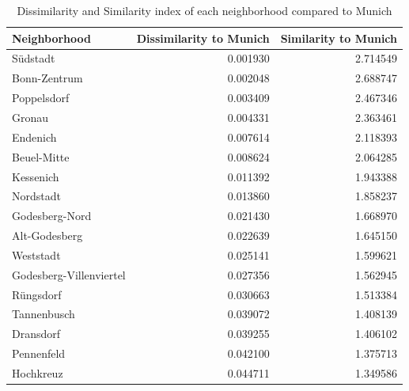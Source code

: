 \documentclass[UKenglish]{scrreprt}
\begin{document}
\begin{table}
	\small
	\caption{Dissimilarity and Similarity index of each neighborhood compared to Munich}
	\label{tab:similiarity_neighborhoods}
	\centering
	\begin{tabular}{lrr}
		\toprule
		Neighborhood &  Dissimilarity to Munich &  Similarity to Munich \\
		\midrule
		Südstadt                            &                 0.001930 &              2.714549 \\
		Bonn-Zentrum                        &                 0.002048 &              2.688747 \\
		Poppelsdorf                         &                 0.003409 &              2.467346 \\
		Gronau                              &                 0.004331 &              2.363461 \\
		Endenich                            &                 0.007614 &              2.118393 \\
		Beuel-Mitte                         &                 0.008624 &              2.064285 \\
		Kessenich                           &                 0.011392 &              1.943388 \\
		Nordstadt                           &                 0.013860 &              1.858237 \\
		Godesberg-Nord                      &                 0.021430 &              1.668970 \\
		Alt-Godesberg                       &                 0.022639 &              1.645150 \\
		Weststadt                           &                 0.025141 &              1.599621 \\
		Godesberg-Villenviertel             &                 0.027356 &              1.562945 \\
		Rüngsdorf                           &                 0.030663 &              1.513384 \\
		Tannenbusch                         &                 0.039072 &              1.408139 \\
		Dransdorf                           &                 0.039255 &              1.406102 \\
		Pennenfeld                          &                 0.042100 &              1.375713 \\
		Hochkreuz                           &                 0.044711 &              1.349586 \\

\end{tabular}
\end{table}
\end{document}
